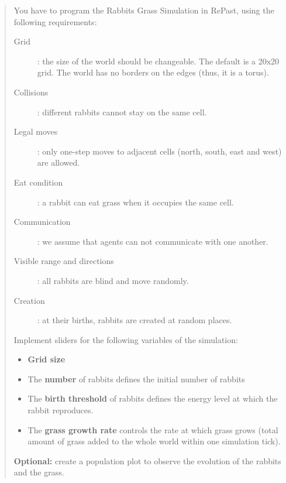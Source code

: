 \documentclass[11pt,a4paper]{article}
\begin{document}
\begin{quote}
{    You have to program the Rabbits Grass Simulation in RePast, using the following requirements:

    \begin{description}
        \item[Grid]: the size of the world should be changeable. The default is
        a 20x20 grid. The world has no borders on the edges (thus, it is a
        torus).

        \item[Collisions]: different rabbits cannot stay on the same cell.

        \item[Legal moves]: only one-step moves to adjacent cells (north,
        south, east and west) are allowed.

        \item[Eat condition]: a rabbit can eat grass when it occupies the same
        cell.

        \item[Communication]: we assume that agents can not communicate with
        one another.

        \item[Visible range and directions]: all rabbits are blind and move
        randomly.

        \item[Creation]: at their births, rabbits are created at random places.

    \end{description}

    Implement sliders for the following variables of the simulation:

    \begin{itemize}
        \item \textbf{Grid size}
        \item The \textbf{number} of rabbits defines the initial number of
        rabbits

        \item The \textbf{birth threshold} of rabbits defines the energy level
        at which the rabbit reproduces.

        \item The \textbf{grass growth rate} controls the rate at which grass
        grows (total amount of grass added to the whole world within one simulation tick).
    \end{itemize}

    \textbf{Optional:} create a population plot to observe the evolution of the
    rabbits and the grass.
}\end{quote}
\end{document}
